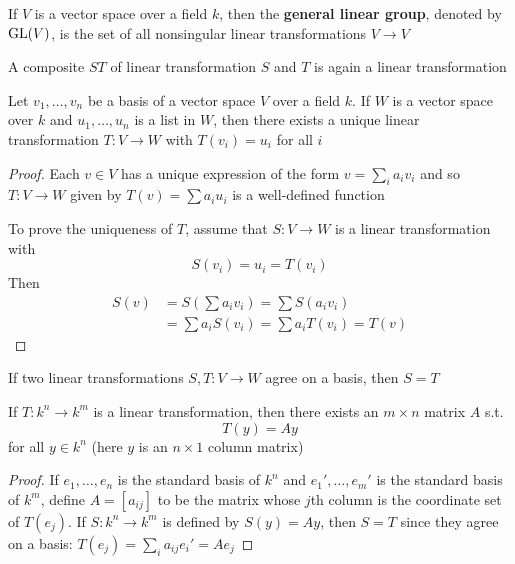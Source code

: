 \documentclass[11pt]{article}
\begin{document}
\begin{definition}[]
If \(V\) is a vector space over a field \(k\), then the \textbf{general linear group},
denoted by \(\text{GL}(V)\), is the set of all nonsingular linear transformations 
\(V\to V\)
\end{definition}

A composite \(ST\) of linear transformation \(S\) and \(T\) is again a linear
transformation 

\begin{theorem}[]
\label{thm3.92}
Let \(v_1,\dots,v_n\) be a basis of a vector space \(V\) over a field \(k\). If
\(W\) is a vector space over \(k\) and \(u_1,\dots,u_n\) is a list in \(W\), then
there exists a unique linear transformation \(T:V\to W\) with \(T(v_i)=u_i\)
for all \(i\)
\end{theorem}

\begin{proof}
Each \(v\in V\) has a unique expression of the form \(v=\sum_ia_iv_i\) and
so \(T:V\to W\) given by \(T(v)=\sum a_iu_i\) is a well-defined function

To prove the uniqueness of \(T\), assume that \(S:V\to W\) is a linear
transformation with 
\begin{equation*}
S(v_i)=u_i=T(v_i)
\end{equation*}
Then 
\begin{align*}
S(v)&=S(\sum a_iv_i)=\sum S(a_iv_i)\\
&=\sum a_iS(v_i)=\sum a_iT(v_i)=T(v)
\end{align*}
\end{proof}

\begin{corollary}[]
If two linear transformations \(S,T:V\to W\) agree on a basis, then \(S=T\)
\end{corollary}

\begin{proposition}[]
If \(T:k^n\to k^m\) is a linear transformation, then there exists an
\(m\times n\) matrix \(A\) s.t.
\begin{equation*}
T(y)=Ay
\end{equation*}
for all \(y\in k^n\) (here \(y\) is an \(n\times 1\) column matrix) 
\end{proposition}

\begin{proof}
If \(e_1,\dots,e_n\) is the standard basis of \(k^n\) and
\(e_1',\dots,e_m'\) is the standard basis of \(k^m\), define \(A=[a_{ij}]\)
to be the matrix whose \(j\)th column is the coordinate set of \(T(e_j)\).
If \(S:k^n\to k^m\) is defined by \(S(y)=Ay\), then \(S=T\) since they agree
on a basis: \(T(e_j)=\sum_ia_{ij}e_i'=Ae_j\)
\end{proof}
\end{document}
